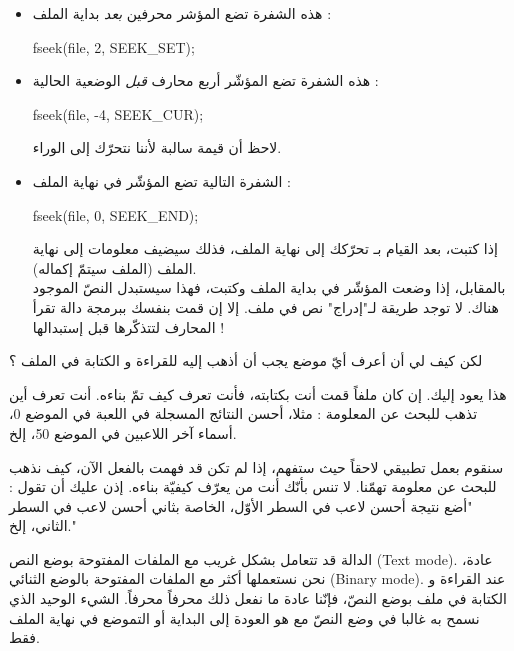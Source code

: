 \begin{itemize}
  \item هذه الشفرة تضع المؤشر محرفين
\textit{بعد}
بداية الملف :

  \begin{Csource}
fseek(file, 2, SEEK_SET);
  \end{Csource}

  \item هذه الشفرة تضع المؤشّر أربع محارف
\textit{قبل}
الوضعية الحالية :

  \begin{Csource}
fseek(file, -4, SEEK_CUR);
  \end{Csource}

  لاحظ أن قيمة
سالبة لأننا نتحرّك إلى الوراء.
  \item الشفرة التالية تضع المؤشّر في نهاية الملف :
 
  \begin{Csource}
fseek(file, 0, SEEK_END);
  \end{Csource}

  إذا كتبت، بعد القيام بـ
تحرّكك إلى نهاية الملف، فذلك سيضيف معلومات إلى نهاية الملف (الملف سيتمّ إكماله).\\
بالمقابل، إذا وضعت المؤشّر في بداية الملف وكتبت، فهذا سيستبدل النصّ الموجود هناك. لا توجد طريقة لـ"إدراج" نص في ملف. إلا إن قمت بنفسك ببرمجة دالة تقرأ المحارف لتتذكّرها قبل إستبدالها !
\end{itemize}

\begin{question}
لكن كيف لي أن أعرف أيّ موضع يجب أن أذهب إليه للقراءة و الكتابة في الملف ؟
\end{question}

هذا يعود إليك. إن كان ملفاً قمت أنت بكتابته، فأنت تعرف كيف تمّ بناءه. أنت تعرف أين تذهب للبحث عن المعلومة : مثلا، أحسن النتائج المسجلة في اللعبة في الموضع 0، أسماء آخر اللاعبين في الموضع 50، إلخ.

سنقوم بعمل تطبيقي لاحقاً حيث ستفهم، إذا لم تكن قد فهمت بالفعل الآن، كيف نذهب للبحث عن معلومة تهمّنا. لا تنس بأنّك أنت من يعرّف كيفيّة بناءه. إذن عليك أن تقول : "أضع نتيجة أحسن لاعب في السطر الأوّل، الخاصة بثاني أحسن لاعب في السطر الثاني، إلخ."

\begin{warning}
الدالة
قد تتعامل بشكل غريب مع الملفات المفتوحة بوضع النص
(\textenglish{Text mode}).
عادة، نحن نستعملها أكثر مع الملفات المفتوحة بالوضع الثنائي
(\textenglish{Binary mode}).
عند القراءة و الكتابة في ملف بوضع النصّ، فإنّنا عادة ما نفعل ذلك محرفاً محرفاً. الشيء الوحيد الذي نسمح به غالبا في وضع النصّ مع
هو العودة إلى البداية أو التموضع في نهاية الملف فقط.
\end{warning}

